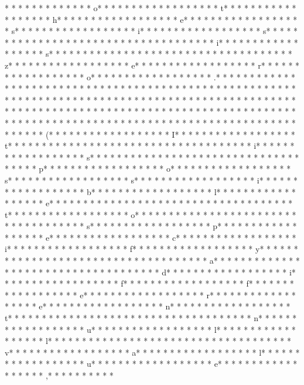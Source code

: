 *  * * *  *  * * *  *  * * *  * o* * *  * * *  * * *  *  * * *  *  * * *  * t* * *  * * *  * * *  *  * * *  *  * * *  * h* * *  * * *  * * *  *  * * *  *  * * *  * e* * *  * * *  * * *  *  * * *  *  * * *  * s* * *  * * *  * * *  *  * * *  *  * * *  * i* * *  * * *  * * *  *  * * *  *  * * *  * s* * *  * * *  * * *  *  * * *  *  * * *  *  * * *  * * *  * * *  *  * * *  *  * * *  * i* * *  * * *  * * *  *  * * *  *  * * *  * s* * *  * * *  * * *  *  * * *  *  * * *  *  * * *  * * *  * * *  *  * * *  *  * * *  * z* * *  * * *  * * *  *  * * *  *  * * *  * e* * *  * * *  * * *  *  * * *  *  * * *  * r* * *  * * *  * * *  *  * * *  *  * * *  * o* * *  * * *  * * *  *  * * *  *  * * *  * .* * *  * * *  * * *  *  * * *  *  * * *  * 
* * *  * * *  * * *  *  * * *  *  * * *  * * *  * * *  *  * * *  *  * * *  * * *  * * *  *  * * *  *  * * *  *  * * *  * * *  * * *  *  * * *  *  * * *  *  * * *  * * *  * * *  *  * * *  *  * * *  *  * * *  * * *  * * *  *  * * *  *  * * *  *  * * *  * * *  * * *  *  * * *  *  * * *  *  * * *  * * *  * * *  *  * * *  *  * * *  *  * * *  * * *  * * *  *  * * *  *  * * *  *  * * *  * * *  * * *  *  * * *  *  * * *  * (* * *  * * *  * * *  *  * * *  *  * * *  * I* * *  * * *  * * *  *  * * *  *  * * *  * t* * *  * * *  * * *  *  * * *  *  * * *  *  * * *  * * *  * * *  *  * * *  *  * * *  * i* * *  * * *  * * *  *  * * *  *  * * *  * s* * *  * * *  * * *  *  * * *  *  * * *  *  * * *  * * *  * * *  *  * * *  *  * * *  * p* * *  * * *  * * *  *  * * *  *  * * *  * o* * *  * * *  * * *  *  * * *  *  * * *  * s* * *  * * *  * * *  *  * * *  *  * * *  * s* * *  * * *  * * *  *  * * *  *  * * *  * i* * *  * * *  * * *  *  * * *  *  * * *  * b* * *  * * *  * * *  *  * * *  *  * * *  * l* * *  * * *  * * *  *  * * *  *  * * *  * e* * *  * * *  * * *  *  * * *  *  * * *  *  * * *  * * *  * * *  *  * * *  *  * * *  * t* * *  * * *  * * *  *  * * *  *  * * *  * o* * *  * * *  * * *  *  * * *  *  * * *  *  * * *  * * *  * * *  *  * * *  *  * * *  * s* * *  * * *  * * *  *  * * *  *  * * *  * p* * *  * * *  * * *  *  * * *  *  * * *  * e* * *  * * *  * * *  *  * * *  *  * * *  * c* * *  * * *  * * *  *  * * *  *  * * *  * i* * *  * * *  * * *  *  * * *  *  * * *  * f* * *  * * *  * * *  *  * * *  *  * * *  * y* * *  * * *  * * *  *  * * *  *  * * *  *  * * *  * * *  * * *  *  * * *  *  * * *  * a* * *  * * *  * * *  *  * * *  *  * * *  *  * * *  * * *  * * *  *  * * *  *  * * *  * d* * *  * * *  * * *  *  * * *  *  * * *  * i* * *  * * *  * * *  *  * * *  *  * * *  * f* * *  * * *  * * *  *  * * *  *  * * *  * f* * *  * * *  * * *  *  * * *  *  * * *  * e* * *  * * *  * * *  *  * * *  *  * * *  * r* * *  * * *  * * *  *  * * *  *  * * *  * e* * *  * * *  * * *  *  * * *  *  * * *  * n* * *  * * *  * * *  *  * * *  *  * * *  * t* * *  * * *  * * *  *  * * *  *  * * *  *  * * *  * * *  * * *  *  * * *  *  * * *  * n* * *  * * *  * * *  *  * * *  *  * * *  * u* * *  * * *  * * *  *  * * *  *  * * *  * l* * *  * * *  * * *  *  * * *  *  * * *  * l* * *  * * *  * * *  *  * * *  *  * * *  *  * * *  * * *  * * *  *  * * *  *  * * *  * v* * *  * * *  * * *  *  * * *  *  * * *  * a* * *  * * *  * * *  *  * * *  *  * * *  * l* * *  * * *  * * *  *  * * *  *  * * *  * u* * *  * * *  * * *  *  * * *  *  * * *  * e* * *  * * *  * * *  *  * * *  *  * * *  * ,* * *  * * *  * * *  * 